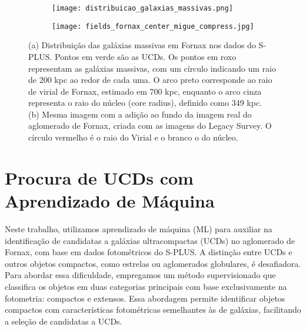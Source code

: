 \begin{figure}[!ht]
\centering
\captionsetup{justification=centering}
\begin{subfigure}[b]{0.75\textwidth}
    \texttt{[image: distribuicao\_galaxias\_massivas.png]}
    \caption{}
\end{subfigure}
\begin{subfigure}[b]{0.75\textwidth}
    \texttt{[image: fields\_fornax\_center\_migue\_compress.jpg]}
    \caption{}
\end{subfigure}
\caption{(a) Distribuição das galáxias massivas em Fornax nos dados do S-PLUS. Pontos em verde são as UCDs. Os pontos em roxo representam as galáxias massivas, com um círculo indicando um raio de 200 kpc ao redor de cada uma. O arco preto corresponde ao raio de virial de Fornax, estimado em 700 kpc, enquanto o arco cinza representa o raio do núcleo (core radius), definido como 349 kpc.\\ (b) Mesma imagem com a adição ao fundo da imagem real do aglomerado de Fornax, criada com as imagens do Legacy Survey. O círculo vermelho é o raio do Virial e o branco o do núcleo.}
\label{distribuicao_galaxias_massivas}
\end{figure}


\section{Procura de UCDs com Aprendizado de Máquina}\label{sec:aprendizado_maquina}
Neste trabalho, utilizamos aprendizado de máquina (\ac{ML}) para auxiliar na identificação de candidatas a galáxias ultracompactas (UCDs) no aglomerado de Fornax, com base em dados fotométricos do S-PLUS. A distinção entre UCDs e outros objetos compactos, como estrelas ou aglomerados globulares, é desafiadora. Para abordar essa dificuldade, empregamos um método supervisionado que classifica os objetos em duas categorias principais com base exclusivamente na fotometria: compactos e extensos. Essa abordagem permite identificar objetos compactos com características fotométricas semelhantes às de galáxias, facilitando a seleção de candidatas a UCDs.

